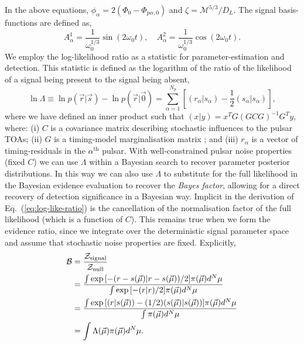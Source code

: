 \documentclass[prd,twocolumn,showpacs,nofootinbib]{revtex4}
\begin{document}
In the above equations, $\phi_{\alpha} = 2(\Phi_0-\Phi_{p\alpha,0})$ and $\zeta=\mathcal{M}^{5/3}/D_L$. The signal basis-functions are defined as,
\begin{equation}\label{eq:non-evolve-basis}
A^1_{\alpha} = \frac{1}{\omega_0^{1/3}}\sin(2\omega_0 t),\quad A^2_{\alpha} = \frac{1}{\omega_0^{1/3}}\cos(2\omega_0 t).
\end{equation}
We employ the log-likelihood ratio as a statistic for parameter-estimation and detection. This statistic is defined as the logarithm of the ratio of the likelihood of a signal being present to the signal being absent,
\begin{equation} \label{eq:log-like-ratio}
\ln\Lambda \equiv \ln p(\vec{r}|\vec{s}) - \ln p(\vec{r}|\vec{0}) = \sum_{\alpha=1}^{N_p} \left[(r_{\alpha}|s_{\alpha}) - \frac{1}{2}(s_{\alpha}|s_{\alpha})\right],
\end{equation}
where we have defined an inner product such that $(x|y) = x^T G(GCG)^{-1}G^T y$, where: (i) $C$ is a covariance matrix describing stochastic influences to the pulsar TOAs; (ii) $G$ is a timing-model marginalisation matrix \citep{van-haasteren-levin-2012}; and (iii) $r_{\alpha}$ is a vector of timing-residuals in the $\alpha^{\text{th}}$ pulsar. With well-constrained pulsar noise properties (fixed $C$) we can use $\Lambda$ within a Bayesian search to recover parameter posterior distributions. In this way we can also use $\Lambda$ to substitute for the full likelihood in the Bayesian evidence evaluation to recover the {\it Bayes factor}, allowing for a direct recovery of detection significance in a Bayesian way. Implicit in the derivation of Eq.\ (\ref{eq:log-like-ratio}) is the cancellation of the normalisation factor of the full likelihood (which is a function of $C$). This remains true when we form the evidence ratio, since we integrate over the deterministic signal parameter space and assume that stochastic noise properties are fixed. Explicitly,
\begin{align}
\mathcal{B} &= \frac{\mathcal{Z}_{\rm signal}}{\mathcal{Z}_{\rm null}}\nonumber\\
&= \frac{\int\exp{\left[ -(r-s(\vec\mu)|r-s(\vec\mu))/2\right]}\pi(\vec\mu)d^N\mu}{\int\exp{\left[ -(r|r)/2\right]}\pi(\vec\mu)d^N\mu} \\\nonumber
&= \frac{\int \exp{\left[ (r|s(\vec\mu)) - (1/2)(s(\vec\mu)|s(\vec\mu))\right]}\pi(\vec\mu)d^N\mu}{\int\pi(\vec\mu)d^N\mu} \\\nonumber
&= \int \Lambda(\vec\mu)\pi(\vec\mu)d^N\mu.
\end{align}
\end{document}
